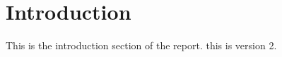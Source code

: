 \section{Introduction}

This is the introduction section of the report. this is version 2.

\lipsum[1-2] %


